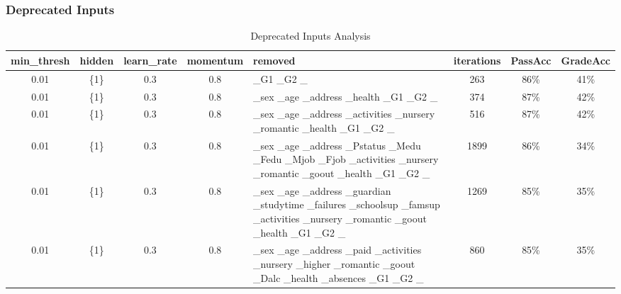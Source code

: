 \documentclass[11pt]{article}
\begin{document}
\subsubsection{Deprecated Inputs}
\begin{table}[h]
\begin{tabular}{| c | c | c | c | p{3cm} | c | c | c |}
\hline \textbf{min\_thresh} & \textbf{hidden} & \textbf{learn\_rate} & \textbf{momentum} & \textbf{removed} & \textbf{iterations} & \textbf{PassAcc} & \textbf{GradeAcc}\\
\hline 0.01 & \{1\} & 0.3 & 0.8 & \_G1 \_G2 \_ & 263 & 86\% & 41\%\\
\hline 0.01 & \{1\} & 0.3 & 0.8 & \_sex \_age \_address \_health \_G1 \_G2 \_ & 374 & 87\% & 42\%\\
\hline 0.01 & \{1\} & 0.3 & 0.8 & \_sex \_age \_address \_activities \_nursery \_romantic \_health \_G1 \_G2 \_ & 516 & 87\% & 42\%\\
\hline 0.01 & \{1\} & 0.3 & 0.8 & \_sex \_age \_address \_Pstatus \_Medu \_Fedu \_Mjob \_Fjob \_activities \_nursery \_romantic \_goout \_health \_G1 \_G2 \_ & 1899 & 86\% & 34\%\\
\hline 0.01 & \{1\} & 0.3 & 0.8 & \_sex \_age \_address \_guardian \_studytime \_failures \_schoolsup \_famsup \_activities \_nursery \_romantic \_goout \_health \_G1 \_G2 \_ & 1269 & 85\% & 35\%\\
\hline 0.01 & \{1\} & 0.3 & 0.8 & \_sex \_age \_address \_paid \_activities \_nursery \_higher \_romantic \_goout \_Dalc \_health \_absences \_G1 \_G2 \_ & 860 & 85\% & 35\%\\
\hline
\end{tabular}
\caption{Deprecated Inputs Analysis}
\end{table}
\end{document}
